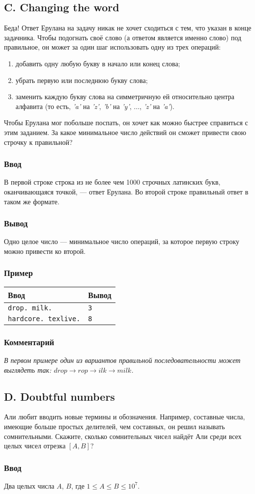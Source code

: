 \documentclass[10pt, a4paper]{article}
\newcommand{\informat}[1]
{
	\subsubsection*{Ввод} #1
}
\newcommand{\outformat}[1]
{
	\subsubsection*{Вывод} #1
}
\newcommand{\examplee}[4]
{
	\subsubsection*{Пример}
	\noindent
	\begin{center}
	\begin{tabularx}{\linewidth}{|X|X|}
	\hline
	Ввод 	& Вывод  	\\
	\hline
	{\tt #1} & {\tt #2}	\\
	\hline
	{\tt #3} & {\tt #4}	\\
	\hline
	\end{tabularx}
	\end{center}
}
\newcommand{\excomm}[1]
{
	\subsubsection*{Комментарий}
	\textit{#1}
}
\begin{document}
\subsection*{C. Changing the word}

Беда! Ответ Ерулана на задачу никак не хочет сходиться с тем, что указан в конце задачника. Чтобы подогнать своё слово (а ответом является именно слово) под правильное, он может за один шаг использовать одну из трех операций:
\begin{enumerate}
\item добавить одну любую букву в начало или конец слова;
\item убрать первую или последнюю букву слова;
\item заменить каждую букву слова на симметричную ей относительно центра алфавита (то есть, \textit{'a'} на \textit{'z'}, \textit{'b'} на \textit{'y'}, $\dots$, \textit{'z'} на \textit{'a'}).
\end{enumerate}
Чтобы Ерулана мог побольше поспать, он хочет как можно быстрее справиться с этим заданием. За какое минимальное число действий он сможет привести свою строчку к правильной?

\informat{В первой строке строка из не более чем 1000 строчных латинских букв, оканчивающаяся точкой, --- ответ Ерулана. \newline 
Во второй строке правильный ответ в таком же формате.}

\outformat{Одно целое число --- минимальное число операций, за которое первую строку можно привести ко второй.}

\examplee{drop. \newline milk.}{3}{hardcore. \newline texlive.}{8}

\excomm{В первом примере один из вариантов правильной последовательности может выглядеть так: $drop \rightarrow rop \rightarrow ilk \rightarrow milk$.}



\subsection*{D. Doubtful numbers}

Али любит вводить новые термины и обозначения. Например, составные числа, имеющие больше простых делителей, чем составных, он решил называть сомнительными. Скажите, сколько сомнительных чисел найдёт Али среди всех целых чисел отрезка $[A, B]$?

\informat{Два целых числа $A$, $B$, где $1 \le A \le B \le 10^7$.}
\end{document}
